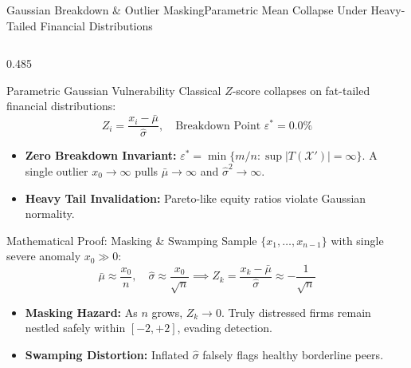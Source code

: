 \begin{frame}{Gaussian Breakdown \& Outlier Masking}{Parametric Mean Collapse Under Heavy-Tailed Financial Distributions}
    \vspace{-0.20cm}
    \begin{columns}[T,onlytextwidth]
        \begin{column}{0.485\textwidth}
            \begin{mathcard}[height=2.74cm]{Parametric Gaussian Vulnerability}
                \fontsize{5.7pt}{6.9pt}\selectfont
                Classical $Z$-score collapses on fat-tailed financial distributions:
                \begin{equation*}
                    \textstyle Z_i = \dfrac{x_i - \bar{\mu}}{\hat{\sigma}}, \quad \text{Breakdown Point } \varepsilon^* = 0.0\%
                \end{equation*}
                \begin{itemize}
                    \setlength{\itemsep}{1.2pt}
                    \item \textbf{Zero Breakdown Invariant:} $\varepsilon^* = \min\{m/n : \sup |T(\mathcal{X}')| = \infty\}$. A single outlier $x_0 \to \infty$ pulls $\bar{\mu} \to \infty$ and $\hat{\sigma}^2 \to \infty$.
                    \item \textbf{Heavy Tail Invalidation:} Pareto-like equity ratios violate Gaussian normality.
                \end{itemize}
            \end{mathcard}

            \vspace{0.12cm}

            \begin{mathcard}[height=2.74cm]{Mathematical Proof: Masking \& Swamping}
                \fontsize{5.7pt}{6.9pt}\selectfont
                Sample $\{x_1, \dots, x_{n-1}\}$ with single severe anomaly $x_0 \gg 0$:
                \begin{equation*}
                    \textstyle \bar{\mu} \approx \frac{x_0}{n}, \quad \hat{\sigma} \approx \frac{x_0}{\sqrt{n}} \implies Z_k = \frac{x_k - \bar{\mu}}{\hat{\sigma}} \approx -\frac{1}{\sqrt{n}}
                \end{equation*}
                \begin{itemize}
                    \setlength{\itemsep}{1.2pt}
                    \item \textbf{Masking Hazard:} As $n$ grows, $Z_k \to 0$. Truly distressed firms remain nestled safely within $[-2, +2]$, evading detection.
                    \item \textbf{Swamping Distortion:} Inflated $\hat{\sigma}$ falsely flags healthy borderline peers.
                \end{itemize}
            \end{mathcard}
        \end{column}


\end{columns}
\end{frame}
